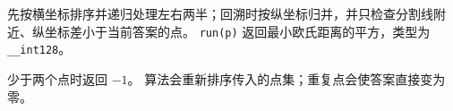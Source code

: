 先按横坐标排序并递归处理左右两半；回溯时按纵坐标归并，并只检查分割线附近、纵坐标差小于当前答案的点。
\texttt{run(p)} 返回最小欧氏距离的平方，类型为 \texttt{\_\_int128}。

\begin{icpcwarning}[输入规模]
  少于两个点时返回 $-1$。
  算法会重新排序传入的点集；重复点会使答案直接变为零。
\end{icpcwarning}
